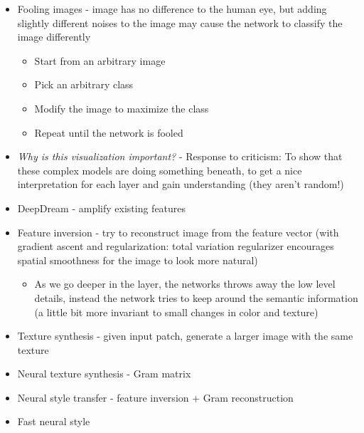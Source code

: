 \begin{itemize}
\begin{itemize}
	\end{itemize}
	\item Fooling images - image has no difference to the human eye, but adding slightly different noises to the image may cause the network to classify the image differently
	\begin{itemize}
		\item Start from an arbitrary image
		\item Pick an arbitrary class
		\item Modify the image to maximize the class
		\item Repeat until the network is fooled
	\end{itemize}
	\item \textit{Why is this visualization important?} - Response to criticism: To show that these complex models are doing something beneath, to get a nice interpretation for each layer and gain understanding (they aren't random!)
	\item DeepDream - amplify existing features
	\item Feature inversion - try to reconstruct image from the feature vector (with gradient ascent and regularization: total variation regularizer encourages spatial smoothness for the image to look more natural)
	\begin{itemize}
		\item As we go deeper in the layer, the networks throws away the low level details, instead the network tries to keep around the semantic information (a little bit more invariant to small changes in color and texture)
	\end{itemize}
	\item Texture synthesis - given input patch, generate a larger image with the same texture
	\item Neural texture synthesis - Gram matrix
	\item Neural style transfer - feature inversion + Gram reconstruction
	\item Fast neural style	
\end{itemize}